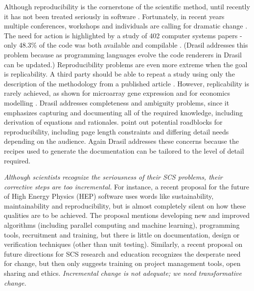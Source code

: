 \documentclass[12pt]{article}
\begin{document}
Although reproducibility is the cornerstone of the scientific method, until
recently it has not been treated seriously in software
\citep{BenureauAndRougier2017}.  Fortunately, in recent years multiple
conferences, workshops and individuals are calling for dramatic change
\citep{BaileyEtAl2016}.  The need for action is highlighted by a study of 402
computer systems papers - only 48.3\% of the code was both available and
compilable \citep{CollbergEtAl2015}.  (Drasil addresses this problem because as
programming languages evolve the code renderers in Drasil can be updated.)
Reproducibility problems are even more extreme when the goal is replicability.
A third party should be able to repeat a study using only the description of the
methodology from a published article %
\citep{BenureauAndRougier2017}.  However, replicability is rarely achieved, as
shown for microarray gene expression \citep{IoannidisEtAl2009} and for economics
modelling \citep{IonescuAndJansson2013}.  Drasil addresses completeness and
ambiguity problems, since it emphasizes capturing and documenting all of the
required knowledge, including derivation of equations and
rationales. \citet{CrickAndHall2014} point out potential roadblocks for
reproducibility, including page length constraints and differing detail needs
depending on the audience.  Again Drasil addresses these concerns because the
recipes used to generate the documentation can be tailored to the level of
detail required.

\emph{Although scientists recognize the seriousness of their SCS problems, their
  corrective steps are too incremental.}  For instance, a recent proposal for
the future of High Energy Physics (HEP) software \cite{StewartEtAl2017} uses
words like sustainability, maintainability and reproducibility, but is almost
completely silent on how these qualities are to be achieved.  The proposal
mentions developing new and improved algorithms (including parallel computing
and machine learning), programming tools, recruitment and training, but there is
little on documentation, design or verification techniques (other than unit
testing).  Similarly, a recent proposal on future directions for SCS research
and education \citep{RudeEtAl2018} recognizes the desperate need for change, but
then only suggests training on project management tools, open sharing and
ethics.  \emph{Incremental change is not adequate; we need transformative
  change.}
\end{document}
